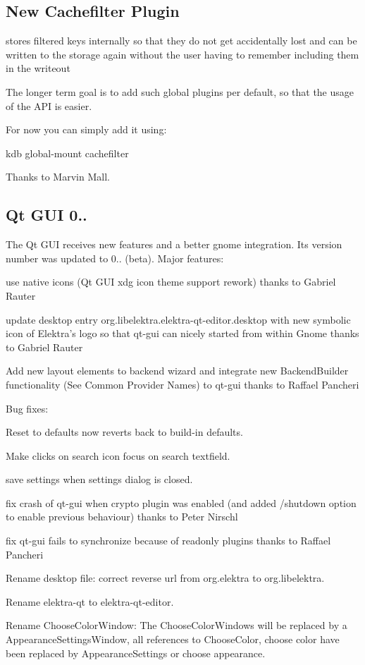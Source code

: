 \subsection*{New Cachefilter Plugin}

stores filtered keys internally so that they do not get accidentally lost and can be written to the storage again without the user having to remember including them in the writeout

The longer term goal is to add such global plugins per default, so that the usage of the A\+P\+I is easier.

For now you can simply add it using\+: \begin{DoxyVerb} kdb global-mount cachefilter
\end{DoxyVerb}


Thanks to Marvin Mall.

\subsection*{Qt G\+U\+I 0..}

The Qt G\+U\+I receives new features and a better gnome integration. Its version number was updated to 0.. (beta). Major features\+:


\begin{DoxyItemize}
\item use native icons (Qt G\+U\+I xdg icon theme support rework) thanks to Gabriel Rauter
\item update desktop entry org.\+libelektra.\+elektra-\/qt-\/editor.\+desktop with new symbolic icon of Elektra's logo so that qt-\/gui can nicely started from within Gnome thanks to Gabriel Rauter
\item Add new layout elements to backend wizard and integrate new Backend\+Builder functionality (See Common Provider Names) to qt-\/gui thanks to Raffael Pancheri
\end{DoxyItemize}

Bug fixes\+:


\begin{DoxyItemize}
\item Reset to defaults now reverts back to build-\/in defaults.
\item Make clicks on search icon focus on search textfield.
\item save settings when settings dialog is closed.
\item fix crash of qt-\/gui when crypto plugin was enabled (and added /shutdown option to enable previous behaviour) thanks to Peter Nirschl
\item fix qt-\/gui fails to synchronize because of readonly plugins thanks to Raffael Pancheri
\item Rename desktop file\+: correct reverse url from org.\+elektra to org.\+libelektra.
\item Rename elektra-\/qt to elektra-\/qt-\/editor.
\item Rename Choose\+Color\+Window\+: The Choose\+Color\+Windows will be replaced by a Appearance\+Settings\+Window, all references to Choose\+Color, choose color have been replaced by Appearance\+Settings or choose appearance.
\end{DoxyItemize}

